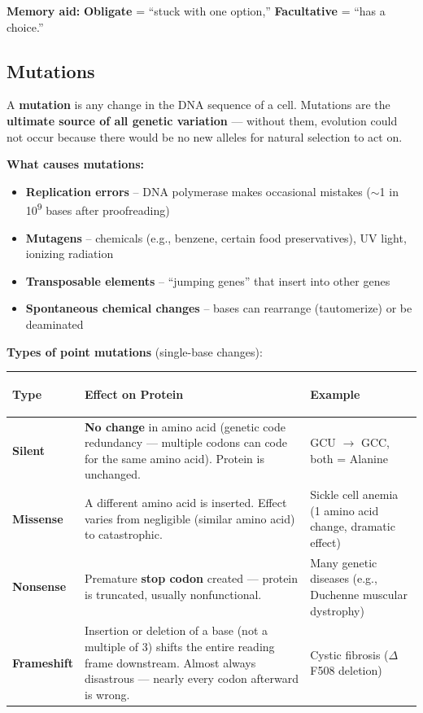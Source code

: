 \documentclass[11pt, letterpaper]{article}
\begin{document}
\textbf{Memory aid:} \textbf{Obligate} = ``stuck with one option,'' \textbf{Facultative} = ``has a choice.''

\subsection*{Mutations}

A \textbf{mutation} is any change in the DNA sequence of a cell. Mutations are the
\textbf{ultimate source of all genetic variation} --- without them, evolution could not occur
because there would be no new alleles for natural selection to act on.

\textbf{What causes mutations:}
\begin{itemize}[noitemsep]
  \item \textbf{Replication errors} -- DNA polymerase makes occasional mistakes ($\sim$1 in 10\textsuperscript{9} bases after proofreading)
  \item \textbf{Mutagens} -- chemicals (e.g., benzene, certain food preservatives), UV light, ionizing radiation
  \item \textbf{Transposable elements} -- ``jumping genes'' that insert into other genes
  \item \textbf{Spontaneous chemical changes} -- bases can rearrange (tautomerize) or be deaminated
\end{itemize}

\textbf{Types of point mutations} (single-base changes):

\noindent
{\renewcommand{\arraystretch}{1.6}
\begin{tabularx}{\textwidth}{>{\bfseries\raggedright\arraybackslash}p{3cm}
                              >{\raggedright\arraybackslash}X
                              >{\raggedright\arraybackslash}p{3cm}}
\toprule
\rowcolor{tableheaderorange}
\textbf{Type} & \textbf{Effect on Protein} & \textbf{Example} \\
\midrule
\rowcolor{rowOr} \textbf{Silent}    & \textbf{No change} in amino acid (genetic code redundancy --- multiple codons can code for the same amino acid). Protein is unchanged. & GCU $\to$ GCC, both = Alanine \\
\rowcolor{rowA}  \textbf{Missense}  & A different amino acid is inserted. Effect varies from negligible (similar amino acid) to catastrophic. & Sickle cell anemia (1 amino acid change, dramatic effect) \\
\rowcolor{rowOr} \textbf{Nonsense}  & Premature \textbf{stop codon} created --- protein is truncated, usually nonfunctional. & Many genetic diseases (e.g., Duchenne muscular dystrophy) \\
\rowcolor{rowA}  \textbf{Frameshift}& Insertion or deletion of a base (not a multiple of 3) shifts the entire reading frame downstream. Almost always disastrous --- nearly every codon afterward is wrong. & Cystic fibrosis ($\Delta$F508 deletion) \\
\bottomrule
\end{tabularx}}
\end{document}
